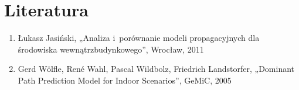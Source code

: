 \documentclass[12pt, a4paper, oneside]{article}
\begin{document}
\section{Literatura}
\begin{enumerate}
\item Łukasz Jasiński, „Analiza i~porównanie modeli propagacyjnych dla środowiska wewnątrzbudynkowego”, Wrocław, 2011
\item Gerd Wölfle, René Wahl, Pascal Wildbolz, Friedrich Landstorfer,  „Dominant Path Prediction Model for Indoor Scenarios”, GeMiC, 2005
\end{enumerate}
\end{document}
